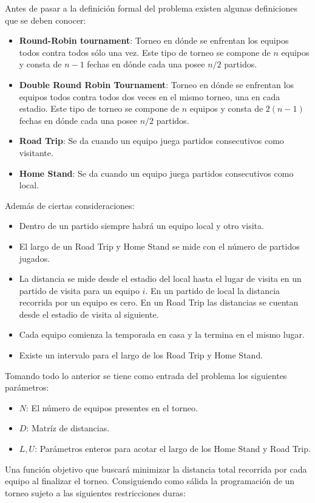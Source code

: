\documentclass[letter, 10pt]{article}
\begin{document}
    Antes de pasar a la definición formal del problema existen algunas definiciones que se deben conocer:
\begin{itemize}
    \item \textbf{Round-Robin tournament}: Torneo en dónde se enfrentan los equipos todos contra todos sólo una vez. Este tipo de torneo se compone de $n$ equipos y consta de $n-1$ fechas en dónde cada una posee $n/2$ partidos.
    \item \textbf{Double Round Robin Tournament}: Torneo en dónde se enfrentan los equipos todos contra todos dos veces en el mismo torneo, una en cada estadio. Este tipo de torneo se compone de $n$ equipos y consta de $2(n-1)$ fechas en dónde cada una posee $n/2$ partidos.
    \item \textbf{Road Trip}: Se da cuando un equipo juega partidos consecutivos como visitante.
    \item \textbf{Home Stand}: Se da cuando un equipo juega partidos consecutivos como local.
\end{itemize}
    Además de ciertas consideraciones:
\begin{itemize}
    \item  Dentro de un partido siempre habrá un equipo local y otro visita.
    \item El largo de un Road Trip y Home Stand se mide con el número de partidos jugados. 
    \item La distancia se mide desde el estadio del local hasta el lugar de visita en un partido de visita para un equipo $i$. En un partido de local la distancia recorrida por un equipo es cero. En un Road Trip las distancias se cuentan desde el estadio de visita al siguiente. 
    \item Cada equipo comienza la temporada en casa y la termina en el mismo lugar.
    \item Existe un intervalo para el largo de los Road Trip y Home Stand.
\end{itemize}
    Tomando todo lo anterior se tiene como entrada del problema los siguientes parámetros:
\begin{itemize}
    \item $N$: El número de equipos presentes en el torneo.
    \item $D$: Matríz de distancias. 
    \item $L, U$: Parámetros enteros para acotar el largo de los Home Stand y Road Trip.
\end{itemize}
    Una función objetivo que buscará minimizar la distancia total recorrida por cada equipo al finalizar el torneo. Consiguiendo como sálida la programación de un torneo sujeto a las siguientes restricciones duras:
\end{document}
